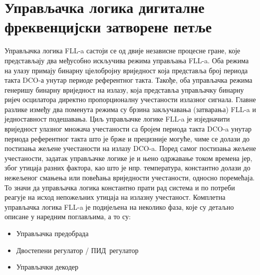 \documentclass[master]{finthesis}
\def \FLL  {FLL} %
\def \DCO  {DCO} %
\def \PID  {ПИД} %
\begin{document}
\section{Управљачка логика дигиталне фреквенцијски затворене петље} \label{section:ctrl}
Управљачка логика \FLL-a састоји се од двије независне процесне гране, које представљају два међусобно искључива режима управљања \FLL-a. Оба режима на улазу примају бинарну цјелобројну вриједност која представља број периода такта \DCO-а унутар периоде референтног такта. Такође, оба управљачка режима генеришу бинарну вриједност на излазу, која представља управљачку бинарну ријеч осцилатора директно пропорционалну учестаности излазног сигнала. Главне разлике између два поменута режима су брзина закључавања (затварања) \FLL-a и једноставност подешавања. Циљ управљачке логике \FLL-a је изједначити вриједност улазног множача учестаности са бројем периода такта \DCO-a унутар периода референтног такта што је брже и прецизније могуће, чиме се долази до постизања жељене учестаности на излазу \DCO-a. Поред самог постизања жељене учестаности, задатак управљачке логике је и њено одржавање током времена јер, због утицаја разних фактора, као што је нпр. температура, константно долази до нежељеног смањења или повећања вриједности учестаности, односно поремећаја. То значи да управљачка логика константно прати рад система и по потреби реагује на исход непожељних утицаја на излазну учестаност. Комплетна управљачка логика \FLL-a је подијељена на неколико фаза, које су детаљно описане у наредним поглављима, а то су:
\begin{itemize}
	\item Управљачка предобрада
	\item Двостепени регулатор / \PID\ регулатор
	\item Управљачки декодер
\end{itemize}
\end{document}
